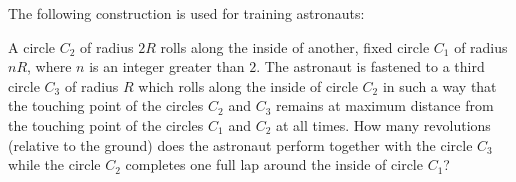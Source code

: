 The following construction is used for training astronauts:

A circle $C_2$ of radius $2R$ rolls along the inside of another, fixed circle $C_1$ of radius $nR$,  where $n$ is an integer greater than $2$. The astronaut is fastened to a third circle $C_3$ of radius $R$ which rolls along the inside of circle $C_2$ in such a way that the touching point of the circles $C_2$ and $C_3$ remains at maximum distance from the touching point of the circles $C_1$ and $C_2$ at all times. How many revolutions (relative to the ground) does the astronaut perform together with the circle $C_3$ while the circle $C_2$ completes one full lap around the inside of circle $C_1$?